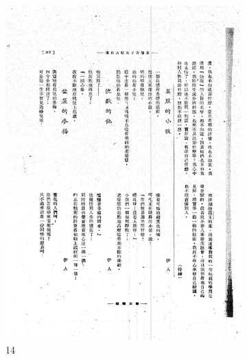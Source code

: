 \documentclass[12pt,twoside]{report}
\begin{document}
\begin{appendices}
\begin{figure}[htbp]
\begin{subfigure}[b]{0.23\linewidth}
        \includegraphics[width=\linewidth]{./figures/testset/14.jpg}
        \caption{14}
        \label{fig:test_14}
    \end{subfigure}
    \hfill
    \begin{subfigure}[b]{0.23\linewidth}

\end{subfigure}
\end{figure}
\end{appendices}
\end{document}
